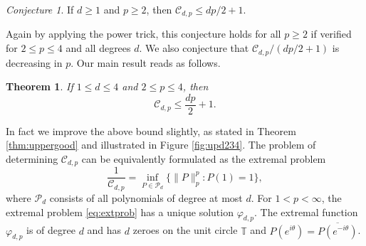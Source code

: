 \documentclass{amsart}
\theoremstyle{plain}
\newtheorem{theorem}{Theorem}
\theoremstyle{remark}
\newtheorem*{conjecture}{Conjecture}
\begin{document}
	
	\begin{conjecture}
		If $d \geq 1$ and $p \geq 2$, then $\mathscr{C}_{d,p} \leq dp/2+1$.
	\end{conjecture}
	Again by applying the power trick, this conjecture holds for all $p \geq 2$ if verified for $2 \leq p \leq 4$ and all degrees $d$. We also conjecture that $\mathscr{C}_{d,p}/(dp/2+1)$ is decreasing in $p$. Our main result reads as follows.
	\begin{theorem}\label{thm:main}
		If $1 \leq d \leq 4$ and $2 \leq p \leq 4$, then 
		\[\mathscr{C}_{d,p} \leq \frac{dp}{2}+1.\]
	\end{theorem}	
	In fact we improve the above bound slightly, as stated in Theorem \ref{thm:uppergood} and illustrated in Figure \ref{fig:upd234}.
	The problem of determining $\mathscr{C}_{d,p}$ can be equivalently formulated as the extremal problem 
	\begin{equation}\label{eq:extprob}
		\frac{1}{\mathscr{C}_{d,p}} = \inf_{P \in \mathscr{P}_d} \{ \|P\|_p^p : P(1)=1\},
	\end{equation}
	where $\mathscr{P}_d$ consists of all polynomials of degree at most $d$. 
	For $1<p<\infty$, the extremal problem \eqref{eq:extprob} has a unique solution $\varphi_{d,p}$. The extremal function $\varphi_{d, p}$ is of degree $d$ and has $d$ zeroes on the unit circle $\mathbb{T}$ and $P(e^{i \theta})=\overline{P(e^{-i \theta})}$. 
\end{document}
